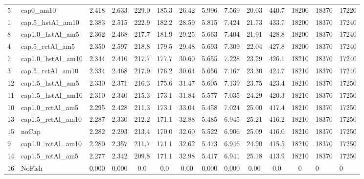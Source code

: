 \documentclass[11pt]{book}
\begin{document}
\begin{landscape}
\begin{longtable}[t]{llccccccccccll}
5 & cap0\_am10 & 2.418 & 2.633 & 229.0 & 185.3 & 26.42 & 5.996 & 7.569 & 20.03 & 440.7 & 18200 & 18370 & 17220\\
1 & cap.5\_hstAl\_am10 & 2.383 & 2.515 & 222.9 & 182.2 & 28.59 & 5.815 & 7.424 & 21.73 & 433.7 & 18200 & 18370 & 17240\\
8 & cap1.0\_hstAl\_am5 & 2.362 & 2.468 & 217.7 & 181.9 & 29.25 & 5.663 & 7.404 & 21.91 & 428.8 & 18200 & 18370 & 17240\\
4 & cap.5\_rctAl\_am5 & 2.350 & 2.597 & 218.8 & 179.5 & 29.48 & 5.693 & 7.309 & 22.04 & 427.8 & 18200 & 18370 & 17240\\
7 & cap1.0\_hstAl\_am10 & 2.344 & 2.410 & 217.7 & 177.7 & 30.60 & 5.655 & 7.228 & 23.29 & 426.1 & 18210 & 18370 & 17240\\
3 & cap.5\_rctAl\_am10 & 2.334 & 2.468 & 217.9 & 176.2 & 30.64 & 5.656 & 7.167 & 23.30 & 424.7 & 18210 & 18370 & 17240\\
12 & cap1.5\_hstAl\_am5 & 2.330 & 2.371 & 216.3 & 175.6 & 31.47 & 5.605 & 7.139 & 23.75 & 423.4 & 18210 & 18370 & 17250\\
11 & cap1.5\_hstAl\_am10 & 2.310 & 2.340 & 215.3 & 173.1 & 31.84 & 5.577 & 7.035 & 24.29 & 420.3 & 18210 & 18370 & 17250\\
10 & cap1.0\_rctAl\_am5 & 2.295 & 2.428 & 211.3 & 173.1 & 33.04 & 5.458 & 7.024 & 25.00 & 417.4 & 18210 & 18370 & 17250\\
13 & cap1.5\_rctAl\_am10 & 2.287 & 2.330 & 212.2 & 171.1 & 32.88 & 5.485 & 6.945 & 25.21 & 416.2 & 18210 & 18370 & 17250\\
15 & noCap & 2.282 & 2.293 & 213.4 & 170.0 & 32.60 & 5.522 & 6.906 & 25.09 & 416.0 & 18210 & 18370 & 17250\\
9 & cap1.0\_rctAl\_am10 & 2.280 & 2.357 & 211.7 & 171.1 & 32.62 & 5.473 & 6.946 & 24.90 & 415.5 & 18210 & 18370 & 17250\\
14 & cap1.5\_rctAl\_am5 & 2.277 & 2.342 & 209.8 & 171.1 & 32.98 & 5.417 & 6.941 & 25.18 & 413.9 & 18210 & 18370 & 17250\\
16 & NoFish & 0.000 & 0.000 & 0.0 & 0.0 & 0.00 & 0.000 & 0.000 & 0.00 & 0.0 & 0 & 0 & 0\\*
\end{longtable}
\end{landscape}
\endgroup{}

\newpage
\end{document}
